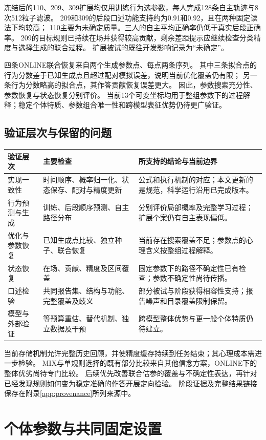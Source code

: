 \documentclass[11pt,a4paper]{article}
\numberwithin{equation}{section}
\begin{document}
冻结后的110、209、309扩展均仅用训练行为选参数，每人完成128条自主轨迹与8次512粒子滤波。
209和309的后段口述功能支持约为0.91和0.92，且在两种固定读法下均较高；
110主要为未确定质量。三人的自主平均正确率仍低于真实后段正确率。
209的目标规则已持续在场并获得较高贡献，剩余差距提示应继续检查分类精度与选择生成的联合过程。
扩展被试的既往开发影响记录为“未确定”。

四条ONLINE联合恢复来自两个生成参数点、每点两条序列。
其中三条拟合点的行为分数差于已知生成点且超过配对模拟误差，说明当前优化覆盖仍有限；
另一条行为分数略高的拟合点，其作答贡献恢复误差更大。
因此，参数搜索充分性、参数恢复与状态恢复分别评价。
当前13个可变坐标均用于整组参数下的过程解释；稳定个体特质、参数组合唯一性和跨模型表征优势仍待更广验证。

\subsection{验证层次与保留的问题}
{\small
\begin{longtable}{L{2.65cm}L{5.7cm}L{6.4cm}}
\toprule
验证层次 & 主要检查 & 所支持的结论与当前边界\\
\midrule\endhead
实现一致性 & 时间顺序、概率归一化、状态保存、配对与精度更新 & 公式和执行机制的对应；本文更新的是规范，科学运行沿用已完成版本。\\
行为预测与生成 & 训练、后段顺序预测、自主路径分布 & 分别评价局部概率及完整学习过程；扩展个案仍有自主表现偏低。\\
优化与参数恢复 & 已知生成点比较、独立种子、联合恢复 & 当前存在搜索覆盖不足；参数点的心理含义按整组过程解释。\\
状态恢复 & 在场、贡献、精度及区间覆盖 & 固定参数下的路径不确定性已有检查；参数不确定性尚待传播。\\
口述检验 & 共同报告集、结构与功能、完整覆盖及歧义 & 部分被试与阶段获得相容性支持；报告噪声和目录覆盖限制保留。\\
模型与外部验证 & 等预算重估、替代机制、独立数据及干预 & 跨模型整体优势与更一般个体特质仍待建立。\\
\bottomrule
\end{longtable}}

当前存储机制允许完整历史回顾，并使精度缓存持续到任务结束；其心理成本需进一步检验。
MIX与单规则选择的既有部分比较来自其他信念方案，ONLINE下的整体优劣尚待专门比较。
后续优先改善联合估参的覆盖与不确定性表达，再针对已经发现规则如何变为稳定准确的作答开展定向检验。
阶段证据及完整结果链接保存在附录\ref{app:provenance}所列来源中。

\appendix
\clearpage
\section{个体参数与共同固定设置}
\label{app:parameters}
\end{document}
